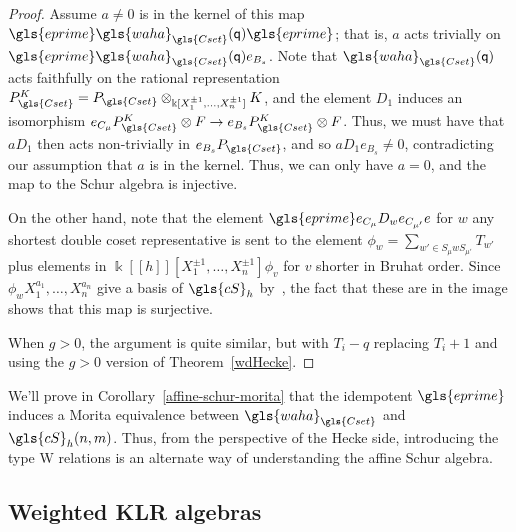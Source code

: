 \documentclass[ALCO,ThmDefs,Unicode,epreuves]{cedram}
\newcommand{\ck}{g}
\newcommand{\pq}{\mathsf{q}}
\newcommand{\K}{\Bbbk}%
\newcommand{\cS}{\gls{cS}}
\newcommand{\waha}{\gls{waha}}
\newcommand\llbracket{[\![}
\newcommand\rrbracket{]\!]}
\begin{document}
\begin{proof}
Assume $a\neq 0$ is in the kernel of this map 
$\gls{eprime} \waha_{\gls{Cset}}(\pq) \gls{eprime}$; that is, $a$ acts trivially on $\gls{eprime}
\waha_{\gls{Cset}}(\pq) e_{B_s}$. Note that
$\waha_{\gls{Cset}}(\pq)$ acts faithfully on the rational representation
$P^K_{\gls{Cset}}=P_{\gls{Cset}}\otimes_{\K[X_1^{\pm 1},\dots,X_n^{\pm 1}]}K$, and the element $D_1$ induces an isomorphism $
e_{C_{\mu} }P_{\gls{Cset}}^K\otimes F\to e_{B_s }P_{\gls{Cset}}^K\otimes
F$. Thus, we must have that $aD_1$ then acts non-trivially in $ e_{B_s }P_{\gls{Cset}}$, and so $aD_1e_{B_s }\neq 0$, contradicting our assumption that
$a$ is in the kernel.
Thus, we can only have $a=0$, and the map to the Schur algebra is injective.

On the other hand, note that the element $\gls{eprime}e_{C_\mu}D_we_{C_{\mu'}}e$
for $w$ any shortest double coset representative is sent to the element
$\phi_w=\sum_{w'\in S_{\mu}w S_{\mu'}}T_{w'}$ plus elements in
$\K\llbracket h\rrbracket [X^{\pm 1}_1,\dots, X^{\pm 1}_n]\phi_v$ for $v$ shorter in Bruhat
order. Since $\phi_w X^{a_1}_1,\dots, X^{a_n}_n$ give a basis of
$\cS_h$ by~\cite[2.2.2]{GreenSchur}, the fact that these are in the image shows that this map is
surjective.

When $\ck >0$, the argument is quite similar, but with $T_i-q$
replacing $T_i+1$ and using the $\ck>0$ version of Theorem~\ref{wdHecke}.
\end{proof}
We'll prove in Corollary~\ref{affine-schur-morita} that the idempotent
$\gls{eprime}$ induces a Morita equivalence between $\waha_{\gls{Cset}}$ and $\gls{cS}_h(n,m)$.
Thus, from the perspective of the Hecke side, introducing the type W
relations is an alternate way of understanding the affine Schur
algebra.

\subsection{Weighted KLR algebras}
\label{sec:weight-klr-algebr}
\end{document}

